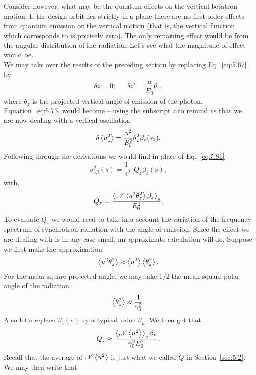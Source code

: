 Consider however, what may be the quantum effects on the vertical betatron motion. If the design orbit lies strictly in a plane there are no first-order effects from quantum emission on the vertical motion (that is, the vertical function which corresponds to is precisely zero). The only remaining effect would be from the angular distribution of the radiation. Let's see what the magnitude of effect would be.\\
We may take over the results of the preceding section by replacing Eq.~\eqref{eq:5.67} by
\begin{align}
	\delta z = 0; && \delta z' = \dfrac{u}{E_0} \theta_z,
\end{align}
where $\theta_z$ is the projected vertical angle of emission of the photon. Equation~\eqref{eq:5.73} would become -- using the subscript $z$ to remind us that we are now dealing with a vertical oscillation --
\begin{align}
	\delta\left< a_z^2 \right> = \dfrac{u^2}{E_0^2} \theta_z^2 \beta_z (s_2).
\end{align}
Following through the derivations we would find in place of Eq.~\eqref{eq:5.81}
\begin{align}
	\sigma_{z\beta}^2(s) = \dfrac{1}{4} \tau_z Q_z \beta_z(s),
\end{align}
with,
\begin{align}
	Q_z = \dfrac{\left< \mathscr{N}\left< u^2 \theta_z^2 \right>\beta_z \right>_s}{E_0^2}.
\end{align}
To evaluate $Q_z$ we would need to take into account the variation of the frequency spectrum of synchrotron radiation with the angle of emission. Since the effect we are dealing with is in any case small, an approximate calculation will do. Suppose we first make the approximation
\begin{align}
	\left< u^2 \theta_z^2 \right> \approx \left< u^2 \right>\left< \theta_z^2 \right>.
\end{align}
For the mean-square projected angle, we may take $1/2$ the mean-square polar angle of the radiation
\begin{align}
	\left< \theta_z^2 \right> \approx \dfrac{1}{\gamma_0^2}.
\end{align}
Also let's replace $\beta_z(s)$ by a typical value $\beta_n$. We then get that
\begin{align}
	Q_z \approx \dfrac{\left< \mathscr{N}\left< u^2 \right> \right>_s\beta_n}{\gamma_0^2 E_0^2}.
\end{align}
Recall that the average of $\mathscr{N}\left< u^2 \right>$ is just what we called $Q$ in Section~\ref{sec:5.2}. We may then write that
